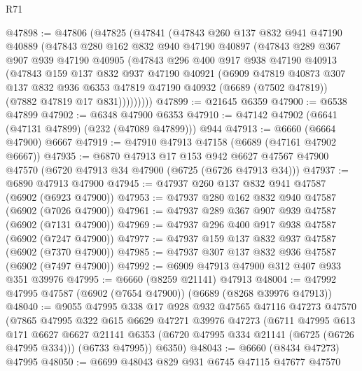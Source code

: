 \begin{lexlean}{R71}
\begin{coremodule}
@47898 := @47806
    (@47825
      (@47841
        (@47843
          @260
          @137
          @832
          @941
          @47190
          @40889
          (@47843
            @280
            @162
            @832
            @940
            @47190
            @40897
            (@47843
              @289
              @367
              @907
              @939
              @47190
              @40905
              (@47843
                @296
                @400
                @917
                @938
                @47190
                @40913
                (@47843
                  @159
                  @137
                  @832
                  @937
                  @47190
                  @40921
                  (@6909
                    @47819
                    @40873
                    @307
                    @137
                    @832
                    @936
                    @6353
                    @47819
                    @47190
                    @40932
                    (@6689 (@7502 @47819))
                    (@7882 @47819 @17 @831)))))))))
@47899 := @21645 @6359
@47900 := @6538 @47899
@47902 := @6348 @47900 @6353
@47910 := @47142 @47902 (@6641 (@47131 @47899) (@232 (@47089 @47899))) @944
@47913 := @6660 (@6664 @47900) @6667
@47919 := @47910 @47913 @47158 (@6689 (@47161 @47902 @6667))
@47935 := @6870
    @47913
    @17
    @153
    @942
    @6627
    @47567
    @47900
    @47570
    (@6720 @47913 @34 @47900 (@6725 (@6726 @47913 @34)))
@47937 := @6890 @47913 @47900
@47945 := @47937 @260 @137 @832 @941 @47587 (@6902 (@6923 @47900))
@47953 := @47937 @280 @162 @832 @940 @47587 (@6902 (@7026 @47900))
@47961 := @47937 @289 @367 @907 @939 @47587 (@6902 (@7131 @47900))
@47969 := @47937 @296 @400 @917 @938 @47587 (@6902 (@7247 @47900))
@47977 := @47937 @159 @137 @832 @937 @47587 (@6902 (@7370 @47900))
@47985 := @47937 @307 @137 @832 @936 @47587 (@6902 (@7497 @47900))
@47992 := @6909 @47913 @47900 @312 @407 @933 @351 @39976
@47995 := @6660 (@8259 @21141) @47913
@48004 := @47992 @47995 @47587 (@6902 (@7654 @47900)) (@6689 (@8268 @39976 @47913))
@48040 := @9055
    @47995
    @338
    @17
    @928
    @932
    @47565
    @47116
    @47273
    @47570
    (@7865
      @47995
      @322
      @615
      @6629
      @47271
      @39976
      @47273
      (@6711
        @47995
        @613
        @171
        @6627
        @6627
        @21141
        @6353
        (@6720 @47995 @334 @21141 (@6725 (@6726 @47995 @334)))
        (@6733 @47995))
      @6350)
@48043 := @6660 (@8434 @47273) @47995
@48050 := @6699 @48043 @829 @931 @6745 @47115 @47677 @47570

\end{coremodule}
\end{lexlean}
